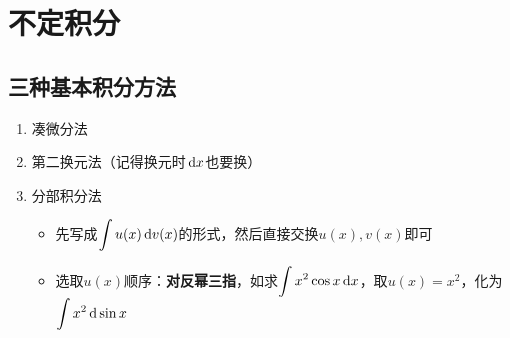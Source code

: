 
\section{不定积分}
\label{section_integration}
\subsection{三种基本积分方法}
\begin{enumerate}
	\item 凑微分法
	\item 第二换元法（记得换元时$\,\mathrm{d} x$也要换）
	\item 分部积分法
	\begin{itemize}
		\item 先写成$\displaystyle\int u(x)\,\mathrm{d} v(x)$的形式，然后直接交换$u(x),v(x)$即可
		\item 选取$u(x)$顺序：\textbf{对反幂三指}，如求$\displaystyle\int x^2\cos x\,\mathrm{d} x$，取$u(x)=x^2$，化为$\displaystyle\int x^2\,\mathrm{d}\sin x$
	\end{itemize}
\end{enumerate}

